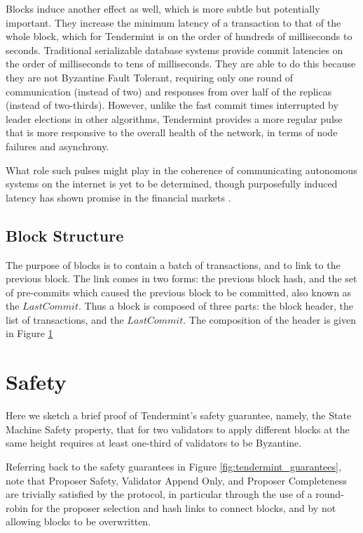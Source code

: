 Blocks induce another effect as well, which is more subtle but potentially important. 
They increase the minimum latency of a transaction to that of the whole block, 
which for Tendermint is on the order of hundreds of milliseconds to seconds.
Traditional serializable database systems provide commit latencies on the 
order of milliseconds to tens of milliseconds.
They are able to do this because they are not Byzantine Fault Tolerant, 
requiring only one round of communication (instead of two)
and responses from over half of the replicas (instead of two-thirds).
However, unlike the fast commit times interrupted by leader elections in other algorithms,
Tendermint provides a more regular pulse that is more responsive to the overall health of the network, 
in terms of node failures and asynchrony.

What role such pulses might play in the coherence of 
communicating autonomous systems on the internet is yet to be determined,
though purposefully induced latency has shown promise in the financial markets \cite{ryan2015beyond}.

\subsection{Block Structure}

The purpose of blocks is to contain a batch of transactions, and to link to the previous block.
The link comes in two forms: the previous block hash,
and the set of pre-commits which caused the previous block to be committed, also known as the $LastCommit$.
Thus a block is composed of three parts: the block header, the list of transactions, and the $LastCommit$.
The composition of the header is given in Figure \ref{fig:header}

\begin{figure}[]
	
	\label{fig:header}
\end{figure}

\section{Safety}

Here we sketch a brief proof of Tendermint's safety guarantee, namely, 
the State Machine Safety property, that for two validators to apply different blocks at the same height
requires at least one-third of validators to be Byzantine.

Referring back to the safety guarantees in Figure \ref{fig:tendermint_guarantees}, 
note that Proposer Safety, Validator Append Only, and Proposer Completeness are trivially satisfied by the protocol, 
in particular through the use of a round-robin for the proposer selection and hash links to connect blocks,
and by not allowing blocks to be overwritten.

